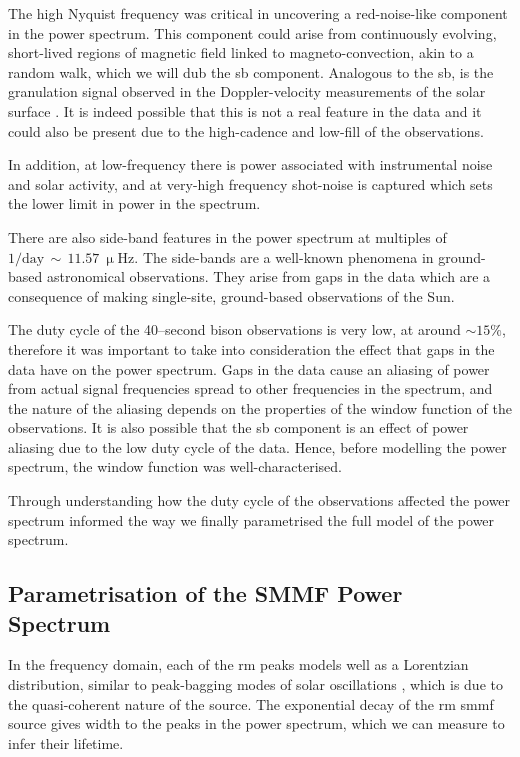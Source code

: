 The high Nyquist frequency was critical in uncovering a red-noise-like component in the power spectrum. This component could arise from continuously evolving, short-lived regions of magnetic field linked to magneto-convection, akin to a random walk, which we will dub the \gls{sb} component. Analogous to the \gls{sb}, is the granulation signal observed in the Doppler-velocity measurements of the solar surface \citep{basu_asteroseismic_2017}. It is indeed possible that this is not a real feature in the data and it could also be present due to the high-cadence and low-fill of the observations.

In addition, at low-frequency there is power associated with instrumental noise and solar activity, and at very-high frequency shot-noise is captured which sets the lower limit in power in the spectrum. 

There are also side-band features in the power spectrum at multiples of $1/\mathrm{day}\,\sim\,11.57~\upmu\mathrm{Hz}$. The side-bands are a well-known phenomena in ground-based astronomical observations. They arise from gaps in the data which are a consequence of making single-site, ground-based observations of the Sun.

The duty cycle of the 40--second \gls{bison} observations is very low, at around $\sim 15\%$, therefore it was important to take into consideration the effect that gaps in the data have on the power spectrum. Gaps in the data cause an aliasing of power from actual signal frequencies spread to other frequencies in the spectrum, and the nature of the aliasing depends on the properties of the window function of the observations. It is also possible that the \gls{sb} component is an effect of power aliasing due to the low duty cycle of the data. Hence, before modelling the power spectrum, the window function was well-characterised.

Through understanding how the duty cycle of the observations affected the power spectrum informed the way we finally parametrised the full model of the power spectrum.


\subsection{Parametrisation of the SMMF Power Spectrum}

In the frequency domain, each of the \gls{rm} peaks models well as a Lorentzian distribution, similar to peak-bagging modes of solar oscillations \citep{handberg_bayesian_2011, davies_low-frequency_2014}, which is due to the quasi-coherent nature of the source. The exponential decay of the \gls{rm} \gls{smmf} source gives width to the peaks in the power spectrum, which we can measure to infer their lifetime.

